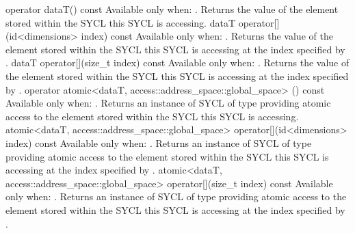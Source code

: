   \addRow
    { operator dataT() const }
    {
      Available only when: .
      \newline
      Returns the value of the element stored within the SYCL  this SYCL  is accessing.
    }
  \addRow
    { dataT operator[](id<dimensions> index) const }
    {
      Available only when: .
      \newline
      Returns the value of the element stored within the SYCL  this SYCL  is accessing at the index
      specified by .
    }
  \addRow
    { dataT operator[](size_t index) const }
    {
      Available only when: .
      \newline
      Returns the value of the element stored within the SYCL  this SYCL  is accessing at the index
      specified by .
    }    
  \addRowTwoL
    { operator atomic<dataT, }
    { access::address_space::global_space> () const }
    {
      Available only when: .
      \newline
      Returns an instance of SYCL  of type 
      providing atomic access to the element stored within the SYCL  this SYCL  is accessing.
    }
  \addRowTwoL
    { atomic<dataT, access::address_space::global_space> }
    { operator[](id<dimensions> index) const }
    {
      Available only when: .
      \newline
      Returns an instance of SYCL  of type 
      providing atomic access to the element stored within the SYCL  this SYCL  is accessing at the index
      specified by .
    }
  \addRowTwoL
    { atomic<dataT, access::address_space::global_space> }
    { operator[](size_t index) const }
    {
      Available only when: .
      \newline
      Returns an instance of SYCL  of type 
      providing atomic access to the element stored within the SYCL  this SYCL  is accessing at the index
      specified by .
    }

